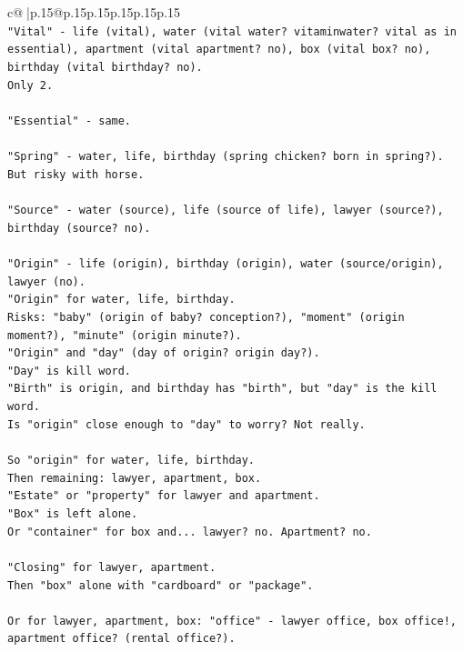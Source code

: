 \documentclass{article}
\begin{document}
{\begin{supertabular}{c@{$\;$}|p{.15\linewidth}@{}p{.15\linewidth}p{.15\linewidth}p{.15\linewidth}p{.15\linewidth}p{.15\linewidth}}
{{{\\ 
\texttt{"Vital" {-} life (vital), water (vital water? vitaminwater? vital as in essential), apartment (vital apartment? no), box (vital box? no), birthday (vital birthday? no).} \\
\texttt{Only 2.} \\
\\ 
\texttt{"Essential" {-} same.} \\
\\ 
\texttt{"Spring" {-} water, life, birthday (spring chicken? born in spring?).} \\
\texttt{But risky with horse.} \\
\\ 
\texttt{"Source" {-} water (source), life (source of life), lawyer (source?), birthday (source? no).} \\
\\ 
\texttt{"Origin" {-} life (origin), birthday (origin), water (source/origin), lawyer (no).} \\
\texttt{"Origin" for water, life, birthday.} \\
\texttt{Risks: "baby" (origin of baby? conception?), "moment" (origin moment?), "minute" (origin minute?).} \\
\texttt{"Origin" and "day" (day of origin? origin day?).} \\
\texttt{"Day" is kill word.} \\
\texttt{"Birth" is origin, and birthday has "birth", but "day" is the kill word.} \\
\texttt{Is "origin" close enough to "day" to worry? Not really.} \\
\\ 
\texttt{So "origin" for water, life, birthday.} \\
\texttt{Then remaining: lawyer, apartment, box.} \\
\texttt{"Estate" or "property" for lawyer and apartment.} \\
\texttt{"Box" is left alone.} \\
\texttt{Or "container" for box and... lawyer? no. Apartment? no.} \\
\\ 
\texttt{"Closing" for lawyer, apartment.} \\
\texttt{Then "box" alone with "cardboard" or "package".} \\
\\ 
\texttt{Or for lawyer, apartment, box: "office" {-} lawyer office, box office!, apartment office? (rental office?).} \\
}}}
\end{supertabular}}
\end{document}
